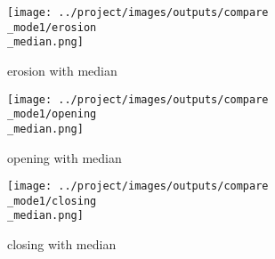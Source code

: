 \begin{figure}[!ht]
\begin{subfigure}[t]{0.22\textwidth}
    \texttt{[image: ../project/images/outputs/compare\\\_mode1/erosion\\\_median.png]}
    \caption{erosion with median}
    \centering
  \end{subfigure}
\begin{subfigure}[t]{0.22\textwidth}
    \texttt{[image: ../project/images/outputs/compare\\\_mode1/opening\\\_median.png]}
    \caption{opening with median}
    \centering
  \end{subfigure}
\begin{subfigure}[t]{0.22\textwidth}
    \texttt{[image: ../project/images/outputs/compare\\\_mode1/closing\\\_median.png]}
    \caption{closing with median}
    \centering
  \end{subfigure}
 \caption{}
 \end{figure}

